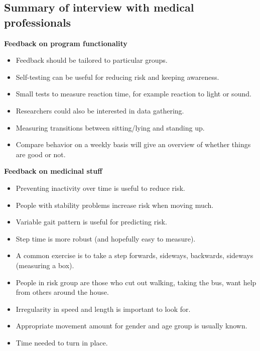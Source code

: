 \subsection{Summary of interview with medical professionals}



\textbf{Feedback on program functionality}
\begin{itemize}
\item Feedback should be tailored to particular groups.
\item Self-testing can be useful for reducing risk and keeping awareness.
\item Small tests to measure reaction time, for example reaction to light or sound.
\item Researchers could also be interested in data gathering.
\item Measuring transitions between sitting/lying and standing up.
\item Compare behavior on a weekly basis will give an overview of whether things are good or not.
\end{itemize}

\textbf{Feedback on medicinal stuff}
\begin{itemize}
\item Preventing inactivity over time is useful to reduce risk.
\item People with stability problems increase risk when moving much.
\item Variable gait pattern is useful for predicting risk.
\item Step time is more robust (and hopefully easy to measure).
\item A common exercise is to take a step forwards, sideways, backwards, sideways (measuring a box).
\item People in risk group are those who cut out walking, taking the bus, want help from others around the house.
\item Irregularity in speed and length is important to look for.
\item Appropriate movement amount for gender and age group is usually known.
\item Time needed to turn in place.
\end{itemize}